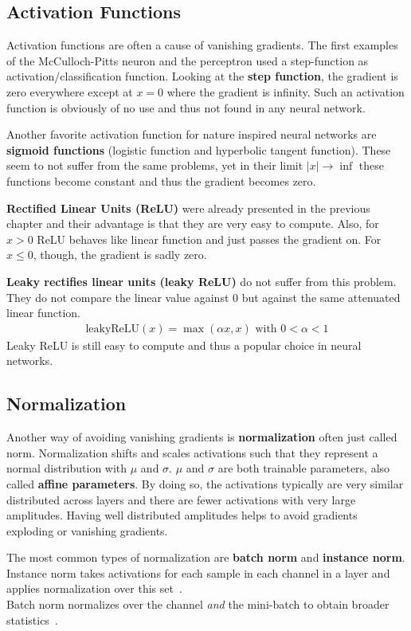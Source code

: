 \subsection{Activation Functions}
Activation functions are often a cause of vanishing gradients.
The first examples of the McCulloch-Pitts neuron and the perceptron used a step-function as activation/classification function.
Looking at the \textbf{step function}, the gradient is zero everywhere except at $x = 0$ where the gradient is infinity.
Such an activation function is obviously of no use and thus not found in any neural network.

Another favorite activation function for nature inspired neural networks are \textbf{sigmoid functions} (logistic function and hyperbolic tangent function).
These seem to not suffer from the same problems, yet in their limit $|x| \rightarrow \inf$ these functions become constant and thus the gradient becomes zero.

\textbf{Rectified Linear Units (ReLU)} were already presented in the previous chapter and their advantage is that they are very easy to compute.
Also, for $x > 0$ ReLU behaves like linear function and just passes the gradient on.
For $x \leq 0$, though, the gradient is sadly zero.

\textbf{Leaky rectifies linear units (leaky ReLU)} do not suffer from this problem.
They do not compare the linear value against $0$ but against the same attenuated linear function.
\begin{align}
    \text{leakyReLU}(x) = \max(\alpha x, x) \text{ with } 0 < \alpha < 1
\end{align}
Leaky ReLU is still easy to compute and thus a popular choice in neural networks.

\subsection{Normalization}
Another way of avoiding vanishing gradients is \textbf{normalization} often just called norm.
Normalization shifts and scales activations such that they represent a normal distribution with $\mu$ and $\sigma$.
$\mu$ and $\sigma$ are both trainable parameters, also called \textbf{affine parameters}.
By doing so, the activations typically are very similar distributed across layers and there are fewer activations with very large amplitudes.
Having well distributed amplitudes helps to avoid gradients exploding or vanishing gradients.

The most common types of normalization are \textbf{batch norm} and \textbf{instance norm}.
Instance norm takes activations for each sample in each channel in a layer and applies normalization over this set~\cite{IN}.\\
Batch norm normalizes over the channel \textit{and} the mini-batch to obtain broader statistics~\cite{BN}.


